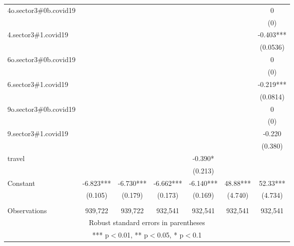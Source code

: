 \documentclass[]{article}
\begin{document}
\begin{tabular}{lcccccc}
4o.sector3\#0b.covid19 &  &  &  &  &  & 0 \\
 &  &  &  &  &  & (0) \\
4.sector3\#1.covid19 &  &  &  &  &  & -0.403*** \\
 &  &  &  &  &  & (0.0536) \\
6o.sector3\#0b.covid19 &  &  &  &  &  & 0 \\
 &  &  &  &  &  & (0) \\
6.sector3\#1.covid19 &  &  &  &  &  & -0.219*** \\
 &  &  &  &  &  & (0.0814) \\
9o.sector3\#0b.covid19 &  &  &  &  &  & 0 \\
 &  &  &  &  &  & (0) \\
9.sector3\#1.covid19 &  &  &  &  &  & -0.220 \\
 &  &  &  &  &  & (0.380) \\
travel &  &  &  & -0.390* &  &  \\
 &  &  &  & (0.213) &  &  \\
Constant & -6.823*** & -6.730*** & -6.662*** & -6.140*** & 48.88*** & 52.33*** \\
 & (0.105) & (0.179) & (0.173) & (0.169) & (4.740) & (4.734) \\
 &  &  &  &  &  &  \\
 Observations & 939,722 & 939,722 & 932,541 & 932,541 & 932,541 & 932,541 \\ \hline
\multicolumn{7}{c}{ Robust standard errors in parentheses} \\
\multicolumn{7}{c}{ *** p$<$0.01, ** p$<$0.05, * p$<$0.1} \\
\end{tabular}
\end{document}
